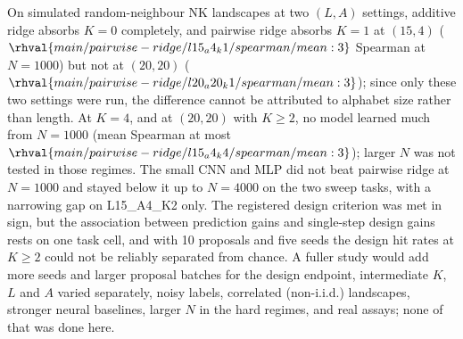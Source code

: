 On simulated random-neighbour NK landscapes at two $(L,A)$ settings, additive ridge absorbs $K=0$ completely, and pairwise ridge absorbs $K=1$ at $(15,4)$ ($\rhval{main/pairwise-ridge/l15_a4_k1/spearman/mean:3}$ Spearman at $N=1000$) but not at $(20,20)$ ($\rhval{main/pairwise-ridge/l20_a20_k1/spearman/mean:3}$); since only these two settings were run, the difference cannot be attributed to alphabet size rather than length. At $K=4$, and at $(20,20)$ with $K\ge2$, no model learned much from $N=1000$ (mean Spearman at most $\rhval{main/pairwise-ridge/l15_a4_k4/spearman/mean:3}$); larger $N$ was not tested in those regimes. The small CNN and MLP did not beat pairwise ridge at $N=1000$ and stayed below it up to $N=4000$ on the two sweep tasks, with a narrowing gap on L15\_A4\_K2 only. The registered design criterion was met in sign, but the association between prediction gains and single-step design gains rests on one task cell, and with 10 proposals and five seeds the design hit rates at $K\ge2$ could not be reliably separated from chance. A fuller study would add more seeds and larger proposal batches for the design endpoint, intermediate $K$, $L$ and $A$ varied separately, noisy labels, correlated (non-i.i.d.) landscapes, stronger neural baselines, larger $N$ in the hard regimes, and real assays; none of that was done here.
